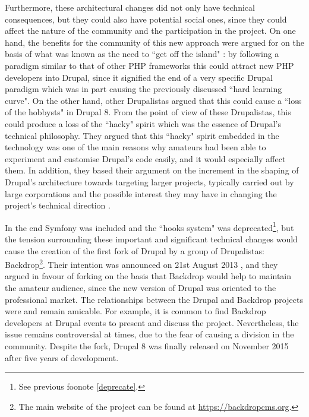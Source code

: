 Furthermore, these architectural changes did not only have technical consequences, but they could also have potential social ones, since they could affect the nature of the community and the participation in the project. On one hand, the benefits for the community of this new approach were argued for \parencite{drupal-symfony-announcement:Online} on the basis of what was known as the need to ``get off the island" \parencite{getting-off-island:2017:Online}: by following a paradigm similar to that of other PHP frameworks this could attract new PHP developers into Drupal, since it signified the end of a very specific Drupal paradigm which was in part causing the previously discussed ``hard learning curve". On the other hand, other Drupalistas argued that this could cause a ``loss of the hobbysts" in Drupal 8. From the point of view of these Drupalistas, this could produce a loss of the ``hacky" spirit which was the essence of Drupal's technical philosophy. They argued that this ``hacky" spirit embedded in the technology was one of the main reasons why amateurs had been able to experiment and customise Drupal's code easily, and it would especially affect them. In addition, they based their argument on the increment in the shaping of Drupal's architecture towards targeting larger projects, typically carried out by large corporations and the possible interest they may have in changing the project's technical direction \parencite{Rogers2014, kein-debate-1:2014:Online, kein-debate-2:2014:Online}. 

In the end Symfony was included and the ``hooks system" was deprecated\footnote{See previous foonote \ref{deprecate}.}, but the tension surrounding these important and significant technical changes would cause the creation of the first fork of Drupal by a group of Drupalistas: Backdrop\footnote{The main website of the project can be found at \url{https://backdropcms.org}.}. Their intention was announced on 21st August 2013 \parencite{drupal-backdrop:Online}, and they argued in favour of forking on the basis that Backdrop would help to maintain the amateur audience, since the new version of Drupal was oriented to the professional market. The relationships between the Drupal and Backdrop projects were and remain amicable. For example, it is common to find Backdrop developers at Drupal events to present and discuss the project. Nevertheless, the issue remains controversial at times, due to the fear of causing a division in the community. Despite the fork, Drupal 8 was finally released on  November 2015 \parencite{d8-release:Online} after five years of development.

